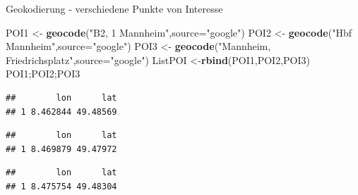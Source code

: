 \documentclass[ignorenonframetext,]{beamer}
\newenvironment{Shaded}{}{}
\newcommand{\KeywordTok}[1]{\textcolor[rgb]{0.00,0.44,0.13}{\textbf{{#1}}}}
\newcommand{\DataTypeTok}[1]{\textcolor[rgb]{0.56,0.13,0.00}{{#1}}}
\newcommand{\StringTok}[1]{\textcolor[rgb]{0.25,0.44,0.63}{{#1}}}
\newcommand{\NormalTok}[1]{{#1}}
\begin{document}
\begin{frame}[fragile]{Geokodierung - verschiedene Punkte von Interesse}

\begin{Shaded}
\begin{Highlighting}[]
\NormalTok{POI1 <-}\StringTok{ }\KeywordTok{geocode}\NormalTok{(}\StringTok{"B2, 1 Mannheim"}\NormalTok{,}\DataTypeTok{source=}\StringTok{"google"}\NormalTok{)}
\NormalTok{POI2 <-}\StringTok{ }\KeywordTok{geocode}\NormalTok{(}\StringTok{"Hbf Mannheim"}\NormalTok{,}\DataTypeTok{source=}\StringTok{"google"}\NormalTok{)}
\NormalTok{POI3 <-}\StringTok{ }\KeywordTok{geocode}\NormalTok{(}\StringTok{"Mannheim, Friedrichsplatz"}\NormalTok{,}\DataTypeTok{source=}\StringTok{"google"}\NormalTok{)}
\NormalTok{ListPOI <-}\KeywordTok{rbind}\NormalTok{(POI1,POI2,POI3)}
\NormalTok{POI1;POI2;POI3}
\end{Highlighting}
\end{Shaded}

\begin{verbatim}
##        lon      lat
## 1 8.462844 49.48569
\end{verbatim}

\begin{verbatim}
##        lon      lat
## 1 8.469879 49.47972
\end{verbatim}

\begin{verbatim}
##        lon      lat
## 1 8.475754 49.48304
\end{verbatim}

\end{frame}
\end{document}

